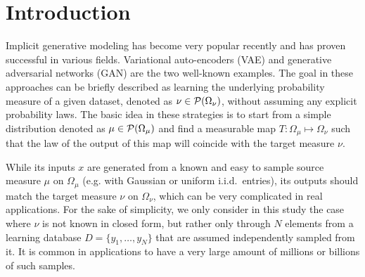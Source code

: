 
\section{Introduction}



Implicit generative modeling has become very popular recently and has proven successful in various fields. Variational auto-encoders (VAE) and generative adversarial networks (GAN) are the two well-known examples.
%
The goal in these approaches can be briefly described as learning the underlying probability measure of a given dataset, denoted as $\nu \in {\cal P}(\Omega_\nu)$, without assuming any explicit probability laws. The basic idea in these strategies is to start from a simple distribution denoted as $\mu \in {\cal P}(\Omega_\mu)$ and find a measurable map $T: \Omega_\mu \mapsto \Omega_\nu$ such that the law of the output of this map will coincide with the target measure $\nu$. 





While its inputs $x$ are generated from a known and easy to sample source measure $\mu$ on $\Omega_\mu$ (e.g. with Gaussian or uniform i.i.d.\ entries), its outputs should match the target measure $\nu$ on $\Omega_\nu$, which can be very complicated in real applications. For the sake of simplicity, we only consider in this study the case where $\nu$ is not known in closed form, but rather only through $N$ elements from a learning database $D = \{y_1 , \dots , y_N \}$ that are assumed independently sampled from it. It is common in applications to have a very large amount of millions or billions of such samples.


